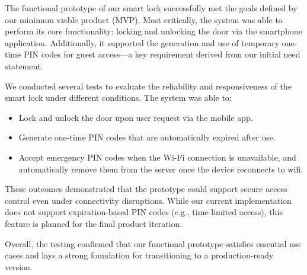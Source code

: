 The functional prototype of our smart lock successfully met the goals defined by our minimum viable product (MVP). Most critically, the system was able to perform its core functionality: locking and unlocking the door via the smartphone application. Additionally, it supported the generation and use of temporary one-time PIN codes for guest access—a key requirement derived from our initial need statement.

We conducted several tests to evaluate the reliability and responsiveness of the smart lock under different conditions. The system was able to:

\begin{itemize}
    \item Lock and unlock the door upon user request via the mobile app.
    \item Generate one-time PIN codes that are automatically expired after use.
    \item Accept emergency PIN codes when the Wi-Fi connection is unavailable, and automatically remove them from the server once the device reconnects to wifi.
\end{itemize}

These outcomes demonstrated that the prototype could support secure access control even under connectivity disruptions. While our current implementation does not support expiration-based PIN codes (e.g., time-limited access), this feature is planned for the final product iteration.

Overall, the testing confirmed that our functional prototype satisfies essential use cases and lays a strong foundation for transitioning to a production-ready version.